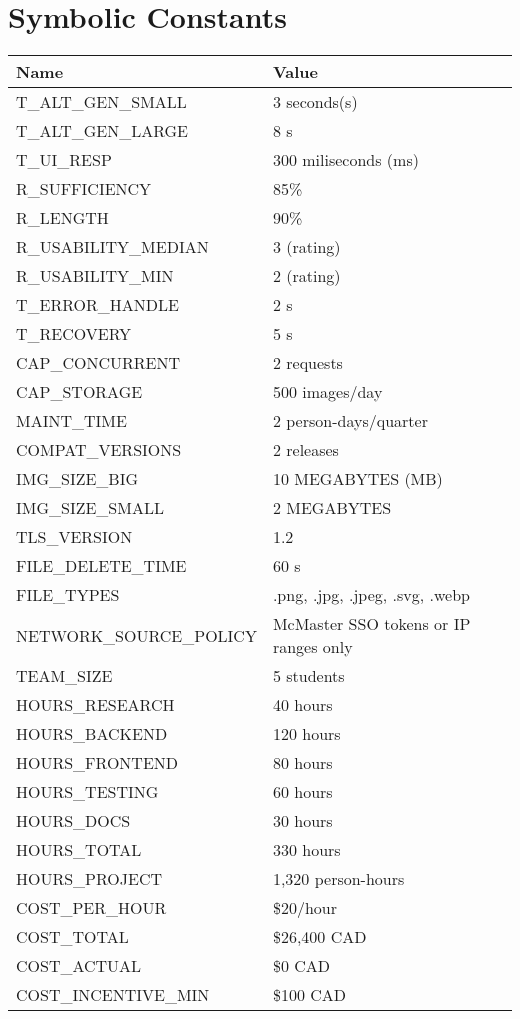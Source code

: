 \documentclass[12pt, titlepage]{article}
\begin{document}
\section*{Symbolic Constants}
\begin{longtable}{|p{8.0cm}|p{8.0cm}|}
\toprule
{\textbf{Name}} & {\textbf{Value}}\\
\midrule
T\_ALT\_GEN\_SMALL & 3 seconds(s) \\
T\_ALT\_GEN\_LARGE & 8 s \\
T\_UI\_RESP & 300 miliseconds (ms) \\
R\_SUFFICIENCY & 85\% \\
R\_LENGTH & 90\% \\
R\_USABILITY\_MEDIAN & 3 (rating) \\
R\_USABILITY\_MIN & 2 (rating) \\
T\_ERROR\_HANDLE & 2 s \\
T\_RECOVERY & 5 s \\
CAP\_CONCURRENT & 2 requests \\
CAP\_STORAGE & 500 images/day \\
MAINT\_TIME & 2 person-days/quarter \\
COMPAT\_VERSIONS & 2 releases \\
IMG\_SIZE\_BIG & 10 MEGABYTES (MB) \\
IMG\_SIZE\_SMALL & 2 MEGABYTES \\
TLS\_VERSION & 1.2 \\ 
FILE\_DELETE\_TIME & 60 s \\
FILE\_TYPES & .png, .jpg, .jpeg, .svg, .webp \\
NETWORK\_SOURCE\_POLICY & McMaster SSO tokens or IP ranges only\\
TEAM\_SIZE & 5 students \\
HOURS\_RESEARCH & 40 hours \\
HOURS\_BACKEND & 120 hours \\
HOURS\_FRONTEND & 80 hours \\
HOURS\_TESTING & 60 hours \\
HOURS\_DOCS & 30 hours \\
HOURS\_TOTAL & 330 hours \\
HOURS\_PROJECT & 1,320 person-hours \\
COST\_PER\_HOUR & \$20/hour \\
COST\_TOTAL & \$26,400 CAD \\
COST\_ACTUAL & \$0 CAD \\
COST\_INCENTIVE\_MIN & \$100 CAD \\

\end{longtable}
\end{document}
